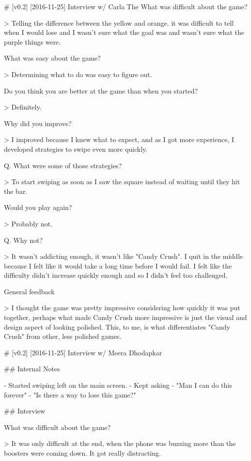 # [v0.2] [2016-11-25] Interview w/ Carla The 
What was difficult about the game?

    > Telling the difference between the yellow and orange.
      it was difficult to tell when I would lose and I wasn't
      sure what the goal was and wasn't sure what the purple
      things were.

What was easy about the game?

    > Determining what to do was easy to figure out.

Do you think you are better at the game than when you started?

    > Definitely.

Why did you improve?

    > I improved because I knew what to expect, and as I
      got more experience, I developed strategies to swipe
      even more quickly. 
      
    Q. What were some of those strategies?
    
    > To start swiping as soon as I saw the square instead
      of waiting until they hit the bar.

Would you play again?

    > Probably not.
    
    Q. Why not?
    
    > It wasn't addicting enough, it wasn't like "Candy Crush".
      I quit in the middle because I felt like it would take
      a long time before I would fail. I felt like the
      difficulty didn't increase quickly enough and so I didn't
      feel too challenged.

General feedback

    > I thought the game was pretty impressive considering
      how quickly it was put together, perhaps what made
      Candy Crush more impressive is just the visual and
      design aspect of looking polished. This, to me, is what
      differentiates "Candy Crush" from other, less polished
      games.


# [v0.2] [2016-11-25] Interview w/ Meera Dhodapkar

## Internal Notes

- Started swiping left on the main screen.
- Kept asking
- "Man I can do this forever"
- "Is there a way to lose this game?"

## Interview

What was difficult about the game?

    > It was only difficult at the end, when the phone
      was buzzing more than the boosters were coming down.
      It got really distracting.

